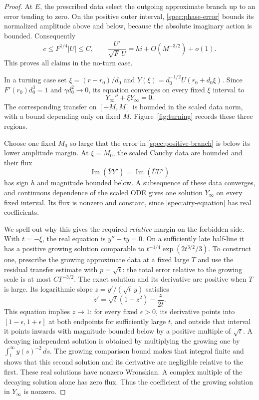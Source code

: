 \begin{proof}
At $E$, the prescribed data select the outgoing approximate branch
up to an error tending to zero. On the positive outer interval,
\eqref{spec:phase-error} bounds its normalized amplitude above and
below, because the absolute imaginary action is bounded. Consequently
\begin{equation}\label{spec:positive-branch}
 c\le F^{1/4}|U|\le C,\qquad
 \frac{U'}{\sqrt F\,U}=hi+O(M^{-3/2})+o(1).
\end{equation}
This proves all claims in the no-turn case.

In a turning case set $\xi=(r-r_0)/d_0$ and
$Y(\xi)=d_0^{-1/2}U(r_0+d_0\xi)$. Since
$F'(r_0)d_0^3=1$ and $\gamma d_0^2\to0$, its equation converges on
every fixed $\xi$ interval to
\begin{equation}\label{spec:airy-equation}
 Y_\infty''+\xi Y_\infty=0.
\end{equation}
The corresponding transfer on $[-M,M]$ is bounded in the scaled data
norm, with a bound depending only on fixed $M$.
Figure~\ref{fig:turning} records these three regions.


Choose one fixed $M_0$ so large that the error in
\eqref{spec:positive-branch} is below its lower amplitude margin.
At $\xi=M_0$, the scaled Cauchy data are bounded and their flux
\[
 \operatorname{Im}(\overline Y Y')
 =\operatorname{Im}(\overline U U')
\]
has sign $h$ and magnitude bounded below. A subsequence of these data
converges, and continuous dependence of the scaled ODE gives one
solution $Y_\infty$ on every fixed interval. Its flux is nonzero and
constant, since \eqref{spec:airy-equation} has real coefficients.

We spell out why this gives the required \emph{relative} margin on
the forbidden side. With $t=-\xi$, the real equation is $y''-ty=0$.
On a sufficiently late half-line it has a positive growing solution
comparable to $t^{-1/4}\exp(2t^{3/2}/3)$. To construct one, prescribe
the growing approximate data at a fixed large $T$ and use the residual
transfer estimate with $p=\sqrt t$: the total error relative to the
growing scale is at most $CT^{-3/2}$. The exact solution and its
derivative are positive when $T$ is large. Its logarithmic slope
$z=y'/(\sqrt t\,y)$ satisfies
\[
 z'=\sqrt t(1-z^2)-\frac{z}{2t}.
\]
This equation implies $z\to1$: for every fixed $\epsilon>0$, its
derivative points into $[1-\epsilon,1+\epsilon]$ at both endpoints
for sufficiently large $t$, and outside that interval it points
inwards with magnitude bounded below by a positive multiple of
$\sqrt t$. A decaying independent solution is obtained by multiplying
the growing one by $\int_t^\infty y(s)^{-2}\,ds$. The growing
comparison bound makes that integral finite and shows that this
second solution and its derivative are negligible relative to the
first. These real solutions have nonzero Wronskian. A complex multiple
of the decaying solution alone has zero flux. Thus the coefficient of
the growing solution in $Y_\infty$ is nonzero.


\end{proof}
